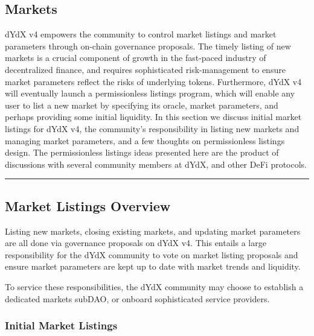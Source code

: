 \begin{fullwidth}
    \section{Markets} \label{sec:markets}

    \begin{adjustwidth}{2cm}{2cm}
        \justify
        dYdX v4 empowers the community to control market listings and market parameters through on-chain governance proposals. The timely listing of new markets is a crucial component of growth in the fast-paced industry of decentralized finance, and requires sophisticated risk-management to ensure market parameters reflect the risks of underlying tokens. Furthermore, dYdX v4 will eventually launch a permissionless listings program, which will enable any user to list a new market by specifying its oracle, market parameters, and perhaps providing some initial liquidity. In this section we discuss initial market listings for dYdX v4, the community's responsibility in listing new markets and managing market parameters, and a few thoughts on permissionless listings design. The permissionless listings ideas presented here are the product of discussions with several community members at dYdX, and other DeFi protocols.
    \end{adjustwidth}
    
    \textcolor{gray}{\rule{\linewidth}{0.1mm}}

\end{fullwidth}

    \subsection{Market Listings Overview} \label{subsec:markets}

        Listing new markets, closing existing markets, and updating market parameters are all done via governance proposals on dYdX v4. This entails a large responsibility for the dYdX community to vote on market listing proposals and ensure market parameters are kept up to date with market trends and liquidity.

        To service these responsibilities, the dYdX community may choose to establish a dedicated markets subDAO, or onboard sophisticated service providers.

        \subsubsection{Initial Market Listings}


